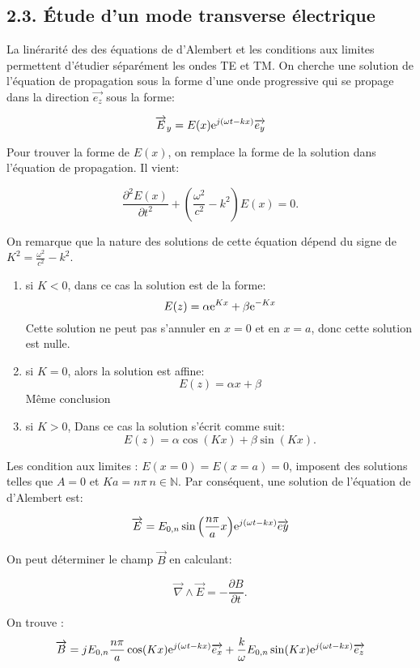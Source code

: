 \documentclass[french, a4paper, 10pt, twocolumn, landscape]{article}
\begin{document}
\subsection*{2.3. Étude d'un mode transverse électrique}

La linérarité des des équations de d'Alembert et les conditions aux limites permettent d'étudier séparément les ondes TE et TM. 
On cherche une solution de l'équation de propagation sous la forme d'une onde progressive qui se propage dans la direction $\vec{e_z}$ sous la forme:

\begin{equation}
	\vec{E}_y = E(x){\rm e}^{j\left(\omega t-k x\right)}\vec{e_y}
\end{equation}

Pour trouver la forme de $E(x)$, on remplace la forme de la solution dans l'équation de propagation. Il vient:

\[\frac{\partial^2 E(x)}{\partial t^2} + \left(\frac{\omega^2}{c^2}-k^2\right)E(x) = 0.\]

On remarque que la nature des solutions de cette équation dépend du signe de $K^2= \frac{\omega^2}{c^2}-k^2$.


\begin{enumerate}
	\item si $K<0$, dans ce cas la solution est de la forme: 
	\[E(z) = \alpha{\rm e}^{Kx}+\beta{\rm e}^{-Kx}\]
	Cette solution ne peut pas s'annuler en $x=0$ et en $x=a$, donc cette solution est nulle.
	\item si $K= 0$, alors la solution est affine:
	\[E(z)=\alpha x + \beta\]
	Même conclusion
	\item si $K>0$, Dans ce cas la solution s'écrit comme suit:
	\[E(z) = \alpha\cos(Kx)+\beta\sin(Kx).\]
\end{enumerate}
	
\noindent Les condition aux limites : $E(x=0)=E(x=a) = 0$, imposent des solutions telles que $A = 0 $ et $Ka=n\pi~n\in \mathbb{N}$. Par conséquent, une solution de l'équation de d'Alembert est: 

\begin{equation}
	\vec{E} = E_{0,n}\sin{\left(\frac{n\pi}{a}x\right)}{\rm e}^{j\left(\omega t-kx\right)}\vec{ey}
\end{equation}

On peut déterminer le champ $\vec{B}$ en calculant: 

\[\vec{\nabla}\wedge \vec{E} = -\frac{\partial B}{\partial t}.\]

On trouve : 
\begin{dmath}
\vec{B} = jE_{0,n}\frac{n\pi}{a}\cos(Kx){\rm e}^{j(\omega t -k x)}\vec{e_x} + \frac{k}{\omega}E_{0,n}\sin(Kx){\rm e}^{j(\omega t-kx)}\vec{e_z} 
\end{dmath}
\end{document}
